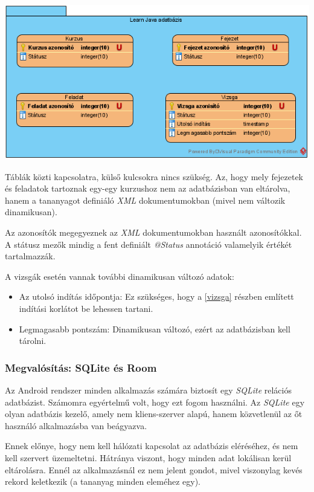 \documentclass[12pt,a4paper]{article}
\newcommand{\xml}{\textit{XML}\xspace}
\begin{document}
	\begin{center}
		\includegraphics[width=\linewidth]{db_model}
	\end{center}
	
	Táblák közti kapcsolatra, külső kulcsokra nincs szükség. Az, hogy mely fejezetek és feladatok tartoznak egy-egy kurzushoz nem az adatbázisban van eltárolva, hanem a tananyagot definiáló \xml dokumentumokban (mivel nem változik dinamikusan).
	
	Az azonosítók megegyeznek az \xml dokumentumokban használt azonosítókkal. A státusz mezők mindig a fent definiált \textit{@Status} annotáció valamelyik értékét tartalmazzák.
	
	A vizsgák esetén vannak további dinamikusan változó adatok:
	
	\begin{itemize}
		\item Az utolsó indítás időpontja: Ez szükséges, hogy a \ref{vizsga} részben említett indítási korlátot be lehessen tartani.
		\item Legmagasabb pontszám: Dinamikusan változó, ezért az adatbázisban kell tárolni.
	\end{itemize}
	
	\subsubsection{Megvalósítás: SQLite és Room}\label{sqlite_roon}

	Az Android rendszer minden alkalmazás számára biztosít egy \textit{SQLite} relációs adatbázist. Számomra egyértelmű volt, hogy ezt fogom használni. Az \textit{SQLite} egy olyan adatbázis kezelő, amely nem kliens-szerver alapú, hanem közvetlenül az őt használó alkalmazásba van beágyazva. 
	
	Ennek előnye, hogy nem kell hálózati kapcsolat az adatbázis eléréséhez, és nem kell szervert üzemeltetni. Hátránya viszont, hogy minden adat lokálisan kerül eltárolásra. Ennél az alkalmazásnál ez nem jelent gondot, mivel viszonylag kevés rekord keletkezik (a tananyag minden eleméhez egy).
	
\end{document}
